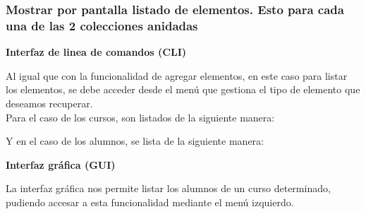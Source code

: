 \subsubsection{Mostrar por pantalla listado de elementos. Esto para cada una de las 2 colecciones anidadas}

\textbf{Interfaz de linea de comandos (CLI)}

Al igual que con la funcionalidad de agregar elementos, en este caso para listar los elementos, se debe acceder desde el menú que gestiona el tipo de elemento que deseamos recuperar.\\

Para el caso de los cursos, son listados de la siguiente manera:


\clearpage

Y en el caso de los alumnos, se lista de la siguiente manera:


\textbf{Interfaz gráfica (GUI)}

La interfaz gráfica nos permite listar los alumnos de un curso determinado, pudiendo accesar a esta funcionalidad mediante el menú izquierdo.

\begin{figure}[h]
    \centering
\end{figure}
